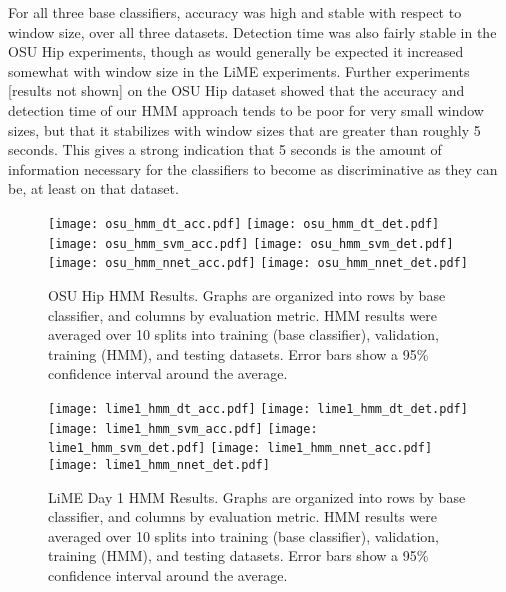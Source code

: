 For all three base classifiers, accuracy was high and
stable with respect to window size, over all three datasets. Detection
time was also fairly stable in the OSU Hip experiments, though as would
generally be expected it increased somewhat with window size in the LiME
experiments. Further experiments [results not shown] on the
OSU Hip dataset showed that the accuracy and detection time of our HMM approach 
tends to be poor for very small window sizes, but that it stabilizes with window sizes
that are greater than roughly 5 seconds. This gives a strong indication that
5 seconds is the amount of information necessary for the classifiers to become as
discriminative as they can be, at least on that dataset.
 
\begin{figure}[H]
 \centering
 \texttt{[image: osu\_hmm\_dt\_acc.pdf]} \hspace{1em}\vspace{1em}
 \texttt{[image: osu\_hmm\_dt\_det.pdf]}
 \texttt{[image: osu\_hmm\_svm\_acc.pdf]} \hspace{1em}\vspace{1em}
 \texttt{[image: osu\_hmm\_svm\_det.pdf]}
 \texttt{[image: osu\_hmm\_nnet\_acc.pdf]} \hspace{1em}
 \texttt{[image: osu\_hmm\_nnet\_det.pdf]}
 \caption{OSU Hip HMM Results.
  Graphs are organized into rows by base classifier, and columns by evaluation
  metric. HMM results were averaged over 10 splits into training
  (base classifier), validation, training (HMM), and testing datasets. Error
  bars show a 95\% confidence interval around the average.}
 \label{fig:osu_hmm}
\end{figure}

\begin{figure}[H]
 \centering
 \texttt{[image: lime1\_hmm\_dt\_acc.pdf]} \hspace{1em}\vspace{1em}
 \texttt{[image: lime1\_hmm\_dt\_det.pdf]} 
 \texttt{[image: lime1\_hmm\_svm\_acc.pdf]} \hspace{1em}\vspace{1em}
 \texttt{[image: lime1\_hmm\_svm\_det.pdf]} 
 \texttt{[image: lime1\_hmm\_nnet\_acc.pdf]} \hspace{1em}
 \texttt{[image: lime1\_hmm\_nnet\_det.pdf]} 
 \caption{LiME Day 1 HMM Results.
  Graphs are organized into rows by base classifier, and columns by evaluation
  metric. HMM results were averaged over 10 splits into training
  (base classifier), validation, training (HMM), and testing datasets. Error
  bars show a 95\% confidence interval around the average.}
 \label{fig:lime1_hmm}
\end{figure}

